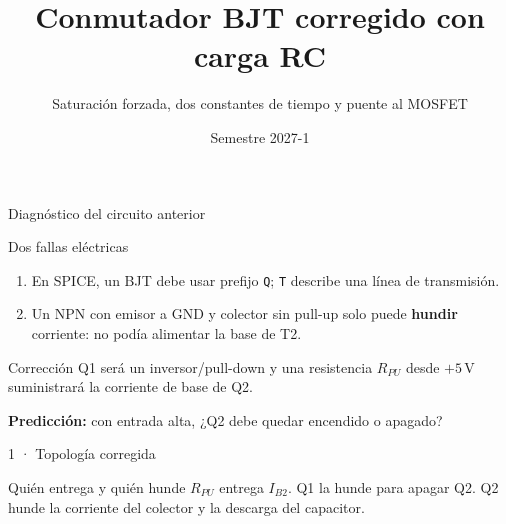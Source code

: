 \documentclass[aspectratio=169]{beamer}
\title[Conmutador BJT]{Conmutador BJT corregido con carga RC}
\subtitle{Saturación forzada, dos constantes de tiempo y puente al MOSFET}
\institute{Licenciatura en Ingeniería Aeroespacial · UNAM}
\date{Semestre 2027-1}
\begin{document}
\begin{frame}[plain]
  \titlepage
\end{frame}

\begin{frame}{Diagnóstico del circuito anterior}
  \begin{alertblock}{Dos fallas eléctricas}
    \begin{enumerate}
      \item En SPICE, un BJT debe usar prefijo \texttt{Q}; \texttt{T} describe
        una línea de transmisión.
      \item Un NPN con emisor a GND y colector sin pull-up solo puede
        \textbf{hundir} corriente: no podía alimentar la base de T2.
    \end{enumerate}
  \end{alertblock}
  \begin{block}{Corrección}
    Q1 será un inversor/pull-down y una resistencia $R_{PU}$ desde $+5\,\mathrm{V}$
    suministrará la corriente de base de Q2.
  \end{block}
  \textbf{Predicción:} con entrada alta, ¿Q2 debe quedar encendido o apagado?
\end{frame}

\begin{frame}{1 · Topología corregida}
  \centering
  \vspace{0.3em}
  \begin{block}{Quién entrega y quién hunde}
    $R_{PU}$ entrega $I_{B2}$. Q1 la hunde para apagar Q2. Q2 hunde la
    corriente del colector y la descarga del capacitor.
  \end{block}
\end{frame}
\end{document}
